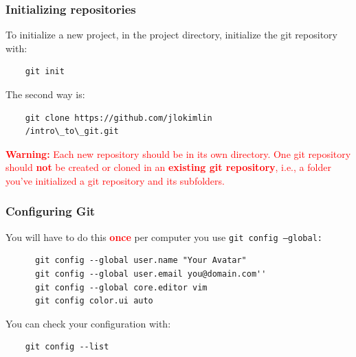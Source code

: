 %
%
\begin{frame}[fragile]
  \frametitle{
    Initializing repositories
  }

  To initialize a new project, in the project directory, initialize the git repository with:

  \begin{lstlisting}
    git init
  \end{lstlisting}


  The second way is:

  \begin{lstlisting}
    git clone https://github.com/jlokimlin
    /intro\_to\_git.git
  \end{lstlisting}


  \textcolor{red}{
    {\bf Warning:} Each new repository should be in its own directory. One git repository should {\bf not} be created or cloned in an {\bf existing git repository}, i.e., a folder you've initialized a git repository and its subfolders.
  }

\end{frame}

%
%
\begin{frame}[fragile]
  \frametitle{
    Configuring Git
  }

  You will have to do this \textcolor{red}{\bf once} per computer you use {\tt git config --global:}

  {
    \footnotesize
    \begin{lstlisting}
      git config --global user.name "Your Avatar"
      git config --global user.email you@domain.com''
      git config --global core.editor vim
      git config color.ui auto
    \end{lstlisting}
  }
  

  You can check your configuration with:
  \begin{lstlisting}
    git config --list
  \end{lstlisting}


\end{frame}


